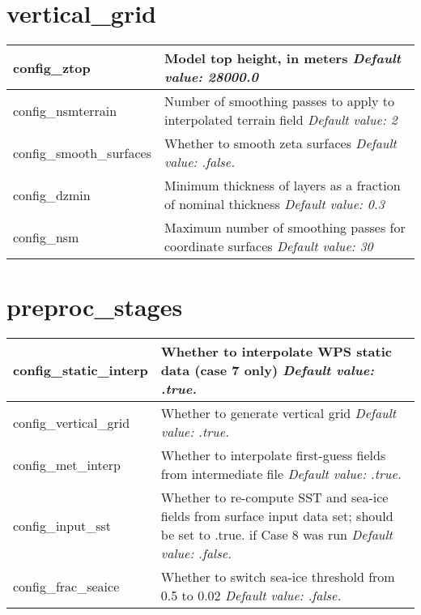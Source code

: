 \section{vertical\_grid}

{\small
\begin{longtable}{|p{1.75in} |p{4.5in}|}
 \hline
   config\_ztop            & Model top height, in meters \newline 
   {\em Default value: 28000.0} \\ \hline
   
   config\_nsmterrain      & Number of smoothing passes to apply to interpolated terrain field \newline 
   {\em Default value: 2} \\ \hline
   
   config\_smooth\_surfaces & Whether to smooth zeta surfaces \newline 
   {\em Default value: .false.} \\ \hline
      
   config\_dzmin & Minimum thickness of layers as a fraction of nominal thickness \newline 
   {\em Default value: 0.3} \\ \hline
      
   config\_nsm & Maximum number of smoothing passes for coordinate surfaces \newline 
   {\em Default value: 30} \\ \hline
\end{longtable}
}

\section{preproc\_stages}

{\small
\begin{longtable}{|p{1.5in} |p{4.75in}|}
 \hline 
   config\_static\_interp   & Whether to interpolate WPS static data (case 7 only) \newline 
   {\em Default value: .true.} \\ \hline

   config\_vertical\_grid   & Whether to generate vertical grid \newline 
   {\em Default value: .true.} \\ \hline

   config\_met\_interp      & Whether to interpolate first-guess fields from intermediate file \newline 
   {\em Default value: .true.} \\ \hline
  
   config\_input\_sst       & Whether to re-compute SST and sea-ice fields from surface input data set; should be set to .true. if Case 8 was run \newline 
   {\em Default value: .false.} \\ \hline
    
   config\_frac\_seaice       & Whether to switch sea-ice threshold from 0.5 to 0.02 \newline 
   {\em Default value: .false.} \\ \hline
\end{longtable}
}

